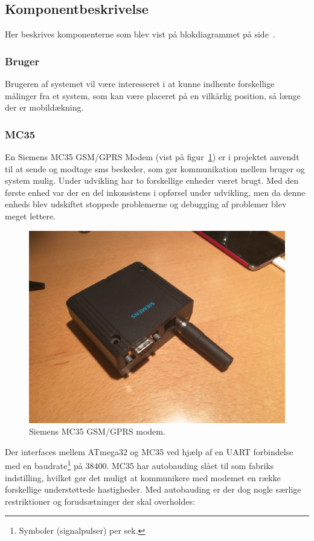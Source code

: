 \subsection{Komponentbeskrivelse}\label{sec:blockdescription}
Her beskrives komponenterne som blev vist på blokdiagrammet på side~\pageref{fig:blockdiagram}. 

\subsubsection{Bruger}
Brugeren af systemet vil være interesseret i at kunne indhente forskellige målinger fra et system, som kan være placeret på en vilkårlig position, så længe der er mobildækning.

\subsubsection{MC35}
En Siemens MC35 GSM/GPRS Modem (vist på figur~\ref{fig:devicegsm}) er i projektet anvendt til at sende og modtage sms beskeder, som gør kommunikation mellem bruger og system mulig. Under udvikling har to forskellige enheder været brugt. Med den første enhed var der en del inkonsistens i opførsel under udvikling, men da denne enheds blev udskiftet stoppede problemerne og debugging af problemer blev meget lettere.

\begin{figure}[h]
	\centering
	\includegraphics[width=0.7\linewidth]{figs/device_gsm.jpg}
	\caption{Siemens MC35 GSM/GPRS modem.}
	\label{fig:devicegsm}
\end{figure}

Der interfaces mellem ATmega32 og MC35 ved hjælp af en UART forbindelse med en baudrate\footnote{Symboler (signalpulser) per sek.} på 38400.
MC35 har autobauding slået til som fabriks indstilling, hvilket gør det muligt at kommunikere med modemet en række forskellige understøttede hastigheder.
Med autobauding er der dog nogle særlige restriktioner og forudsætninger der skal overholdes:

